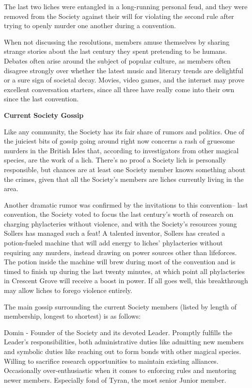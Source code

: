\documentclass[blue]{Sel}
\begin{document}
The last two liches were entangled in a long-running personal feud, and they were removed from the Society against their will for violating the second rule after trying to openly murder one another during a convention.

When not discussing the resolutions, members amuse themselves by sharing strange stories about the last century they spent pretending to be humans. Debates often arise around the subject of popular culture, as members often disagree strongly over whether the latest music and literary trends are delightful or a sure sign of societal decay. Movies, video games, and the internet may prove excellent conversation starters, since all three have really come into their own since the last convention.

\textbf{Current Society Gossip}

Like any community, the Society has its fair share of rumors and politics. One of the juiciest bits of gossip going around right now concerns a rash of gruesome murders in the British Isles that, according to investigators from other magical species, are the work of a lich. There’s no proof a Society lich is personally responsible, but chances are at least one Society member knows something about the crimes, given that all the Society’s members are liches currently living in the area.

Another dramatic rumor was confirmed by the invitations to this convention-- last convention, the Society voted to focus the last century’s worth of research on charging phylacteries without violence, and with the Society’s resources young Sollers has managed such a feat! A talented inventor, Sollers has created a potion-fueled machine that will add energy to liches’ phylacteries without requiring any murders, instead drawing on power sources other than lifeforces. The potion inside the machine will brew during most of the convention and is timed to finish up during the last twenty minutes, at which point all phylacteries in Crescent Grove will receive a boost in power. If all goes well, this breakthrough may allow liches to forego violence entirely.

The main gossip surrounding the current Society members (listed by length of membership, longest to shortest) is as follows:

Domin - Founder of the Society and its devoted Leader. Promptly fulfills the Leader’s responsibilities, both administrative duties like admitting new members and symbolic duties like reaching out to form bonds with other magical species. Willing to sacrifice research opportunities to maintain existing alliances. Occasionally over-enthusiastic when it comes to enforcing rules and mentoring newer members. Especially fond of Tyran, the most senior Junior member.
\end{document}
